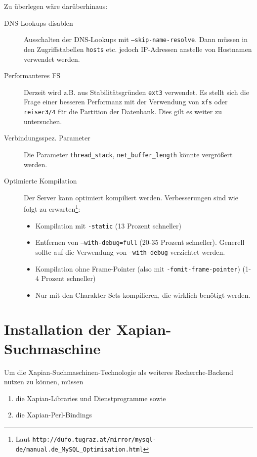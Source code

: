 \documentclass[11pt, twoside, a4paper, BCOR8mm, DIV12, bibtotoc,idxtotoc]{scrbook}
\begin{document}
Zu überlegen wäre darüberhinaus:

\begin{description}
\item[DNS-Lookups disablen] Ausschalten der DNS-Lookups mit
  \texttt{--skip-name-resolve}. Dann müssen in den Zugriffstabellen
  \texttt{hosts} etc. jedoch IP-Adressen anstelle von Hostnamen
  verwendet werden.
\item[Performanteres FS] Derzeit wird z.B. aus Stabilitätsgründen
  \texttt{ext3} verwendet. Es stellt sich die Frage einer besseren
  Performanz mit der Verwendung von \texttt{xfs} oder
  \texttt{reiser3/4} für die Partition der Datenbank. Dies gilt es
  weiter zu untersuchen.
\item[Verbindungsspez. Parameter] Die Parameter \texttt{thread\_stack},
  \texttt{net\_buffer\_length} könnte ver\-grö\-ßert werden.
\item[Optimierte Kompilation] Der Server kann optimiert kompiliert
  werden. Verbesserungen sind wie folgt zu erwarten\footnote{Laut
    \texttt{http://dufo.tugraz.at/mirror/mysql-de/manual.de\_MySQL\_Optimisation.html}}:

  \begin{itemize}
    \item Kompilation mit \texttt{-static} (13 Prozent schneller)
    \item Entfernen von \texttt{--with-debug=full} (20-35 Prozent
      schneller). Generell sollte auf die Verwendung von \texttt{--with-debug} verzichtet
      werden.
    \item Kompilation ohne Frame-Pointer (also mit
      \texttt{-fomit-frame-pointer}) (1-4 Prozent schneller)
    \item Nur mit den Charakter-Sets kompilieren, die wirklich benötigt werden. 
  \end{itemize}
\end{description}



\section{Installation der Xapian-Suchmaschine}
\label{sec:instxapian}

Um die Xapian-Suchmaschinen-Technologie als weiteres Recherche-Backend
nutzen zu können, müssen

\begin{enumerate}
\item die Xapian-Libraries und Dienstprogramme sowie
\item die Xapian-Perl-Bindings
\end{enumerate}
\end{document}
